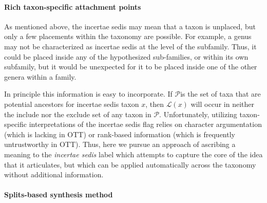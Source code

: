\documentclass[english]{article}
\begin{document}

\paragraph{Rich taxon-specific attachment points}

As mentioned above, the incertae sedis may mean that a taxon is
unplaced, but only a few placements within the taxonomy are possible.
For example, a genus may not be characterized as incertae sedis at the
level of the subfamily. Thus, it could be placed inside any of the
hypothesized sub-families, or within its own subfamily, but it would
be unexpected for it to be placed inside one of the other genera
within a family.

In principle this information is easy to incorporate. If
$\mathcal{P}$is the set of taxa that are potential ancestors for
incertae sedis taxon $x$, then $\mathcal{L}(x)$ will occur in neither
the include nor the exclude set of any taxon in $\mathcal{P}$.
Unfortunately, utilizing taxon-specific interpretations of the
incertae sedis flag relies on character argumentation (which is
lacking in OTT) or rank-based information (which is frequently
untrustworthy in OTT). Thus, here we pursue an approach of ascribing a
meaning to the \emph{incertae sedis} label which attempts to capture
the core of the idea that it articulates, but which can be applied
automatically across the taxonomy without additional information.

\paragraph{Splits-based synthesis method}

 
\end{document}
